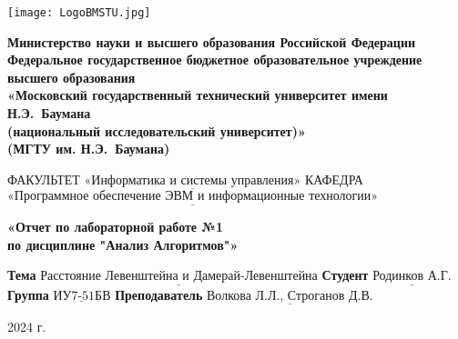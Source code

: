 \newcommand{\Cafedra}{«Программное обеспечение ЭВМ и информационные технологии»}
\newcommand{\Facultet}{«Информатика и системы управления»}

\newcommand{\TeacherPosition}{должность}
\newcommand{\mainTeacherData}{Волкова Л.Л.}
\newcommand{\fullTeachersData}{Волкова Л.Л., Строганов Д.В.}

\newcommand{\labNumber}{№}
\newcommand{\labName}{}
\newcommand{\labCourse}{Анализ Алгоритмов}
\newcommand{\labTheme}{Расстояние Левенштейна и Дамерай-Левенштейна}
\newcommand{\studentGroup}{ИУ7-51БВ}
\newcommand{\studentName}{Родинков А.Г.}

\thispagestyle{empty}

\begin{title}
	
	\begin{center}
		\noindent
		\begin{minipage}{0.180\textwidth}
			
			\texttt{[image: LogoBMSTU.jpg]} %
		\end{minipage}%
		\begin{minipage}{0.88\textwidth}
			\centering
			{\fontsize{13}{8}\selectfont
				\textbf{Министерство науки и высшего образования Российской Федерации}\\
				{\setlength{\parindent}{2em} 
				\textbf{Федеральное государственное бюджетное образовательное учреждение высшего образования}\\
				}
				\textbf{«Московский государственный технический университет имени Н.Э.~Баумана}\\
				\textbf{(национальный исследовательский университет)»}\\
				\textbf{(МГТУ им. Н.Э.~Баумана)}
			}
		\end{minipage}
	\end{center}
	
	\vspace{1cm}
	
	\noindent ФАКУЛЬТЕТ $\underline{\text{\Facultet}}$ \n
	\noindent КАФЕДРА $\underline{\text{\Cafedra}}$
	
	
	\vspace{5cm}
	
	\begin{center}
		{\noindent
			{\fontsize{21}{10}\selectfont
				{\setlength{\parindent}{2em}
				\textbf{«Отчет по лабораторной работе {\labNumber}1}\\
				}
				\textbf{по дисциплине "{\labCourse}"»}\n
			}
		}
	\end{center}
	
	\vspace{6cm}
	
	\noindent\textbf{Тема} 			$\underline{\text{\labTheme}}$\n
	\noindent\textbf{Студент} 		$\underline{\text{\studentName}}$\n
	\noindent\textbf{Группа} 		$\underline{\text{\studentGroup}}$\n
	\noindent\textbf{Преподаватель} $\underline{\text{\fullTeachersData}}$\n
		
	\begin{center}
		\vfill 2024 г.
	\end{center}
\end{title}